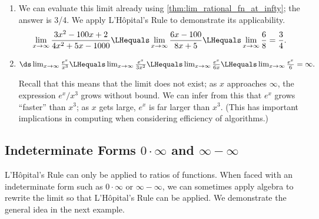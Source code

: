 \begin{example}
\begin{enumerate}
	\item	We can evaluate this limit already using \autoref{thm:lim_rational_fn_at_infty}; the answer is 3/4. We apply L'Hôpital's Rule to demonstrate its applicability.
\[
 \lim_{x\to\infty} \frac{3x^2-100x+2}{4x^2+5x-1000}
 \LHequals \lim_{x\to\infty} \frac{6x-100}{8x+5}
 \LHequals \lim_{x\to\infty} \frac68 = \frac34.
\]

	\item	$\ds\lim_{x\to \infty}\frac{e^x}{x^3} \LHequals \lim_{x\to\infty} \frac{e^x}{3x^2} \LHequals \lim_{x\to\infty} \frac{e^x}{6x} \LHequals \lim_{x\to\infty} \frac{e^x}{6} = \infty.$

Recall that this means that the limit does not exist; as $x$ approaches $\infty$, the expression $e^x/x^3$ grows without bound. We can infer from this that $e^x$ grows ``faster'' than $x^3$; as $x$ gets large, $e^x$ is far larger than $x^3$. (This has important implications in computing when considering efficiency of algorithms.)
\end{enumerate}
\end{example}

\subsection{Indeterminate Forms \texorpdfstring{$0\cdot\infty$ and $\infty-\infty$}{0·∞ and ∞-∞}}

L'Hôpital's Rule can only be applied to ratios of functions. When faced with an indeterminate form such as $0\cdot\infty$ or $\infty-\infty$, we can sometimes apply algebra to rewrite the limit so that L'Hôpital's Rule can be applied. We demonstrate the general idea in the next example.


